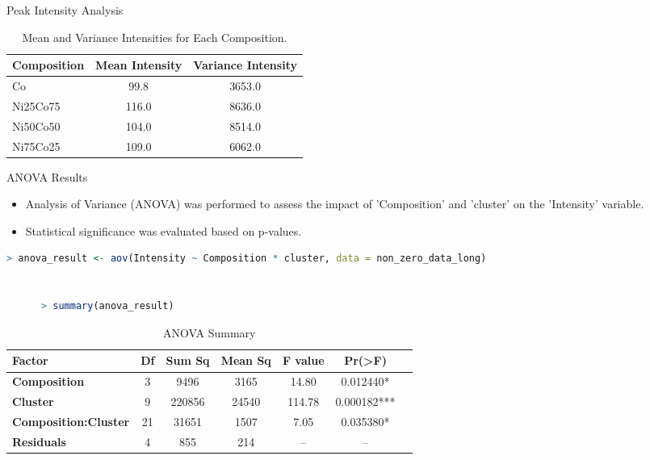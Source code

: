 \documentclass[aspectratio=169]{beamer}
\begin{document}
\begin{frame}[fragile]{Peak Intensity Analysis}
\begin{table}[h]
\centering
\begin{tabular}{lcc}
\toprule
Composition & Mean Intensity & Variance Intensity \\
\midrule
Co          & 99.8       & 3653.0        \\
Ni25Co75    & 116.0      & 8636.0        \\
Ni50Co50    & 104.0      & 8514.0        \\
Ni75Co25    & 109.0      & 6062.0        \\
\bottomrule
\end{tabular}
\caption{Mean and Variance Intensities for Each Composition.}
\label{tab:composition_stats}
\end{table}
\end{frame}

\begin{frame}[fragile]{ANOVA Results}
    \begin{itemize}
        \item Analysis of Variance (ANOVA) was performed to assess the impact of 'Composition' and 'cluster' on the 'Intensity' variable.
        \item Statistical significance was evaluated based on p-values.
    \end{itemize}

    \begin{lstlisting}[language=R, basicstyle=\tiny\ttfamily]
      > anova_result <- aov(Intensity ~ Composition * cluster, data = non_zero_data_long)


      > summary(anova_result)

\end{lstlisting}

\begin{table}[h]
\centering
\begin{tabular}{lcccccc}
\hline
\textbf{Factor} & \textbf{Df} & \textbf{Sum Sq} & \textbf{Mean Sq} & \textbf{F value} & \textbf{Pr(>F)} \\
\hline
\textbf{Composition} & 3 & 9496 & 3165 & 14.80 & 0.012440* \\
\textbf{Cluster} & 9 & 220856 & 24540 & 114.78 & 0.000182*** \\
\textbf{Composition:Cluster} & 21 & 31651 & 1507 & 7.05 & 0.035380* \\
\textbf{Residuals} & 4 & 855 & 214 & -- & -- \\
\hline
\end{tabular}
\caption{ANOVA Summary}
\label{tab:anova_summary}
\end{table}
\end{frame}
\end{document}
